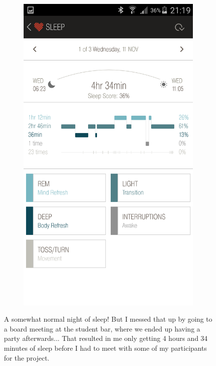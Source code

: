 \documentclass[12pt,a4paper]{article}
\begin{document}
\begin{figure}[H]
\begin{subfigure}[b]{0.5\textwidth}
        \includegraphics[width=\textwidth]{11-11-15-1.png}
    \end{subfigure}
\caption{A somewhat normal night of sleep! But I messed that up by going to a board meeting at the student bar, where we ended up having a party afterwards... That resulted in me only getting 4 hours and 34 minutes of sleep before I had to meet with some of my participants for the project.}
\end{figure}
\end{document}
